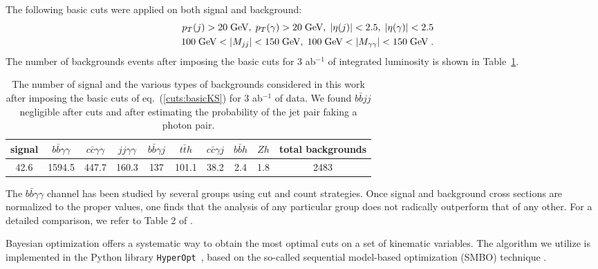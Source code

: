 The following basic cuts were applied on both signal and background:
%
\begin{eqnarray}
& & p_T(j) > 20\;\hbox{GeV},\; p_T(\gamma) > 20\;\hbox{GeV},\; |\eta(j)|<2.5,\; |\eta(\gamma)|<2.5 \nonumber \\
& & 100\;\hbox{GeV} < |M_{jj}| < 150\;\hbox{GeV},\; 100\;\hbox{GeV} < |M_{\gamma\gamma}| < 150\;\hbox{GeV}\; .
\label{cuts:basicKS} 
\end{eqnarray}
%
The number of backgrounds events after imposing the basic cuts for 3 ab$^{-1}$ of integrated luminosity is shown in Table~\ref{table:nevKS}.
%
\begin{table}[!h]
\centering
\begin{tabular}{c|c|c|c|c|c|c|c|c|c}
\hline\hline
signal & $b\bar{b}\gamma\gamma$ & $c\bar{c}\gamma\gamma$ & $jj\gamma\gamma$ & $b\bar{b}\gamma j$ & $t\bar{t}h$ & $c\bar{c}\gamma j$ &  $b\bar{b} h$ & $Zh$ & total backgrounds \\ 
\hline
42.6   & 1594.5  & 447.7   &  160.3 &   137 & 101.1  & 38.2  &  2.4    & 1.8 & 2483 \\
\hline\hline
\end{tabular}
\caption{The number of signal and the various types of backgrounds considered in this work after imposing the basic cuts of eq.~(\ref{cuts:basicKS}) for 3 ab$^{-1}$ of data. We found $b\bar{b} jj$ negligible after cuts and after estimating the probability of the jet pair faking a photon pair.}
\label{table:nevKS}
\end{table}


The $b\bar{b}\gamma\gamma$ channel has been studied by several groups using cut and count strategies. Once signal and background cross sections are normalized to the proper values, one finds that the analysis of any particular group does not radically outperform that of any other. For a detailed comparison, we refer to Table 2 of \cite{Alves:2017ued}. 

Bayesian optimization  offers a systematic way to obtain the most optimal cuts on a set of kinematic variables. The algorithm we utilize is implemented in the Python library \texttt{HyperOpt}~, based on the so-called sequential model-based optimization (SMBO) technique \cite{Bergstra1, Bergstra2, hyperopt}.

